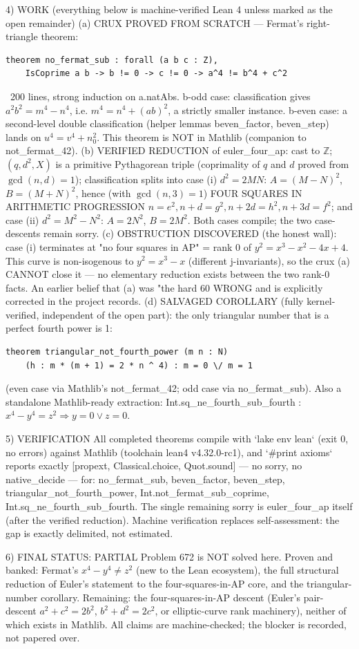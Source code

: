 4) WORK (everything below is machine-verified Lean 4 unless marked as the open remainder)
(a) CRUX PROVED FROM SCRATCH — Fermat's right-triangle theorem:
\begin{verbatim}
theorem no_fermat_sub : forall (a b c : Z),
    IsCoprime a b -> b != 0 -> c != 0 -> a^4 != b^4 + c^2
\end{verbatim}
~200 lines, strong induction on a.natAbs. b-odd case: classification gives
$a^2 b^2 = m^4 - n^4$, i.e. $m^4 = n^4 + (ab)^2$, a strictly smaller instance. b-even case:
a second-level double classification (helper lemmas beven_factor, beven_step) lands on
$u^4 = v^4 + n_0^2$. This theorem is NOT in Mathlib (companion to not_fermat_42).
(b) VERIFIED REDUCTION of euler_four_ap: cast to $\mathbb{Z}$; $(q,d^2,X)$ is a primitive
Pythagorean triple (coprimality of $q$ and $d$ proved from $\gcd(n,d)=1$); classification
splits into case (i) $d^2=2MN$: $A=(M-N)^2$, $B=(M+N)^2$, hence (with $\gcd(n,3)=1$)
FOUR SQUARES IN ARITHMETIC PROGRESSION $n=e^2, n+d=g^2, n+2d=h^2, n+3d=f^2$; and case (ii)
$d^2=M^2-N^2$: $A=2N^2$, $B=2M^2$. Both cases compile; the two case-descents remain sorry.
(c) OBSTRUCTION DISCOVERED (the honest wall): case (i) terminates at "no four squares in
AP" = rank 0 of $y^2=x^3-x^2-4x+4$. This curve is non-isogenous to $y^2=x^3-x$
(different j-invariants), so the crux (a) CANNOT close it — no elementary reduction exists
between the two rank-0 facts. An earlier belief that (a) was "the hard 60%
WRONG and is explicitly corrected in the project records.
(d) SALVAGED COROLLARY (fully kernel-verified, independent of the open part): the only
triangular number that is a perfect fourth power is 1:
\begin{verbatim}
theorem triangular_not_fourth_power (m n : N)
    (h : m * (m + 1) = 2 * n ^ 4) : m = 0 \/ m = 1
\end{verbatim}
(even case via Mathlib's not_fermat_42; odd case via no_fermat_sub). Also a standalone
Mathlib-ready extraction: Int.sq_ne_fourth_sub_fourth : $x^4-y^4=z^2 \Rightarrow y=0 \lor z=0$.

5) VERIFICATION
All completed theorems compile with `lake env lean` (exit 0, no errors) against Mathlib
(toolchain lean4 v4.32.0-rc1), and `#print axioms` reports exactly
[propext, Classical.choice, Quot.sound] — no sorry, no native_decide — for:
no_fermat_sub, beven_factor, beven_step, triangular_not_fourth_power,
Int.not_fermat_sub_coprime, Int.sq_ne_fourth_sub_fourth.
The single remaining sorry is euler_four_ap itself (after the verified reduction).
Machine verification replaces self-assessment: the gap is exactly delimited, not estimated.

6) FINAL STATUS: PARTIAL
Problem 672 is NOT solved here. Proven and banked: Fermat's $x^4-y^4\ne z^2$ (new to the
Lean ecosystem), the full structural reduction of Euler's statement to the four-squares-in-AP
core, and the triangular-number corollary. Remaining: the four-squares-in-AP descent
(Euler's pair-descent $a^2+c^2=2b^2$, $b^2+d^2=2c^2$, or elliptic-curve rank machinery),
neither of which exists in Mathlib. All claims are machine-checked; the blocker is recorded,
not papered over.
